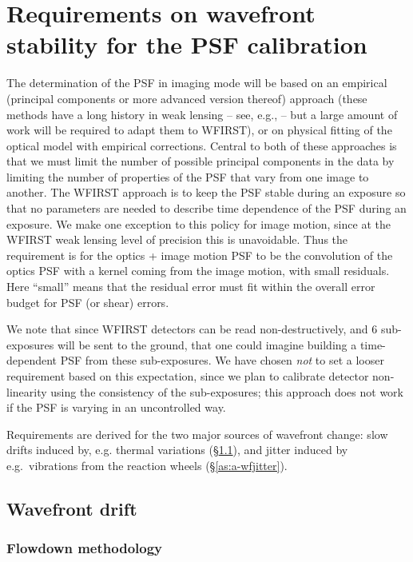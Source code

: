 \documentclass[usenatbib]{mnras}
\begin{document}
\section{Requirements on wavefront stability for the PSF calibration}
\label{app:psf-stability}

The determination of the PSF in imaging mode will be based on an empirical (principal components or more advanced version thereof) approach (these methods have a long history in weak lensing -- see, e.g., \citealt{2004astro.ph.12234J, 2007PASP..119.1403J} -- but a large amount of work will be required to adapt them to WFIRST), or on physical fitting of the optical model \citep{2012SPIE.8442E..10J} with empirical corrections. Central to both of these approaches is that we must limit the number of possible principal components in the data by limiting the number of properties of the PSF that vary from one image to another. The WFIRST approach is to keep the PSF stable during an exposure so that no parameters are needed to describe time dependence of the PSF during an exposure. We make one exception to this policy for image motion, since at the WFIRST weak lensing level of precision this is unavoidable. Thus the requirement is for the optics + image motion PSF to be the convolution of the optics PSF with a kernel coming from the image motion, with small residuals. Here ``small'' means that the residual error must fit within the overall error budget for PSF (or shear) errors.

We note that since WFIRST detectors can be read non-destructively, and 6 sub-exposures will be sent to the ground, that one could imagine building a time-dependent PSF from these sub-exposures. We have chosen {\em not} to set a looser requirement based on this expectation, since we plan to calibrate detector non-linearity using the consistency of the sub-exposures; this approach does not work if the PSF is varying in an uncontrolled way.

Requirements are derived for the two major sources of wavefront change: slow drifts induced by, e.g. thermal variations (\S\ref{as:a-drift}), and jitter induced by e.g.\ vibrations from the reaction wheels (\S\ref{as:a-wfjitter}).

\subsection{Wavefront drift}
\label{as:a-drift}

\subsubsection{Flowdown methodology}
\label{as:drift-method}
\end{document}
